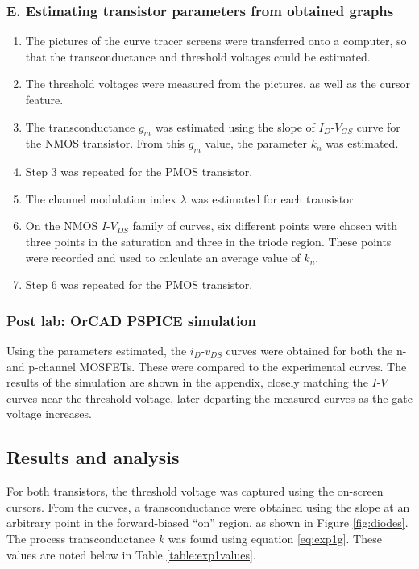 \documentclass{report}
\begin{document}
\subsubsection{E. Estimating transistor parameters from obtained graphs}
\begin{enumerate}
	\item The pictures of the curve tracer screens were transferred onto a computer, so that the transconductance and threshold voltages could be estimated.
	\item The threshold voltages were measured from the pictures, as well as the cursor feature.
	\item The transconductance $g_m$ was estimated using the slope of $I_D$-$V_{GS}$ curve for the NMOS transistor. From this $g_m$ value, the parameter $k_n$ was estimated.
	\item Step 3 was repeated for the PMOS transistor.
	\item The channel modulation index $\lambda$ was estimated for each transistor.
	\item On the NMOS $I$-$V_{DS}$ family of curves, six different points were chosen with three points in the saturation and three in the triode region. These points were recorded and used to calculate an average value of $k_n$.
	\item Step 6 was repeated for the PMOS transistor.
\end{enumerate}

\subsubsection{Post lab: OrCAD PSPICE simulation}
Using the parameters estimated, the $i_D$-$v_{DS}$ curves were obtained for both the n- and p-channel MOSFETs. These were compared to the experimental curves. The results of the simulation are shown in the appendix, closely matching the $I$-$V$ curves near the threshold voltage, later departing the measured curves as the gate voltage increases.
\subsection{Results and analysis}
For both transistors, the threshold voltage was captured using the on-screen cursors. From the curves, a transconductance were obtained using the slope at an arbitrary point in the forward-biased ``on'' region, as shown in Figure \ref{fig:diodes}. The process transconductance $k$ was found using equation \eqref{eq:exp1g}. These values are noted below in Table \ref{table:exp1values}.
\end{document}
